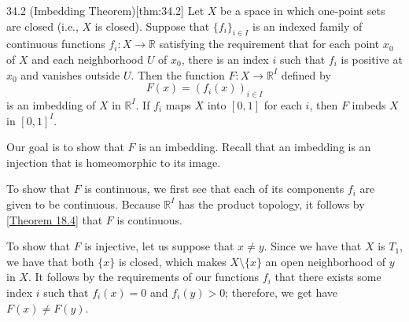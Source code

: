 \begin{thmBox}{34.2 (Imbedding Theorem)}[thm:34.2]
    Let \( X \) be a space in which one-point sets are closed (i.e., \( X \) is closed).
    Suppose that \( \{ f_{ i } \}_{ i \in I } \) is an indexed family of continuous 
    functions \( f_{ i }: X \rightarrow \mathbb{R} \) satisfying the requirement that 
    for each point \( x_{ 0 } \) of \( X \) and each neighborhood \( U \) of 
    \( x_{ 0 } \), there is an index \( i \) such that \( f_{ i } \) is positive at
    \( x_{ 0 } \) and vanishes outside \( U \).
    Then the function \( F: X \rightarrow \mathbb{R}^{ I } \) defined by 
    \begin{equation*}
        F ( x )
        =
        ( f_{ i } ( x ) )_{ i \in I }
    \end{equation*}
    is an imbedding of \( X \) in \( \mathbb{R}^{ I } \). 
    If \( f_{ i } \) maps \( X \) into \( [ 0, 1 ] \) for each \( i \), then \( F \)
    imbeds \( X \) in \( [ 0, 1 ]^{ I } \).

    \baseRule

    \begin{proofBox}
        Our goal is to show that \( F \) is an imbedding.
        Recall that an imbedding is an injection that is homeomorphic to its image.

        \baseSkip

        To show that \( F \) is continuous, we first see that each of its components
        \( f_{ i } \) are given to be continuous.
        Because \( \mathbb{R}^{ I } \) has the product topology, it follows by 
        [\hyperlink{thm:18.4}{Theorem 18.4}] that \( F \) is continuous.

        \baseSkip

        To show that \( F \) is injective, let us suppose that \( x \neq y \).
        Since we have that \( X \) is \( T_{ 1 } \), we have that both \( \{ x \} \)
        is closed, which makes \( X \setminus \{ x \} \) an open neighborhood of
        \( y \) in \( X \).
        It follows by the requirements of our functions \( f_{ i } \) that there exists 
        some index \( i \) such that 
        \( f_{ i } ( x ) = 0 \) and \( f_{ i } ( y ) > 0 \); therefore, we get have
        \( F ( x ) \neq F ( y ) \).

        \baseSkip


\end{proofBox}
\end{thmBox}
